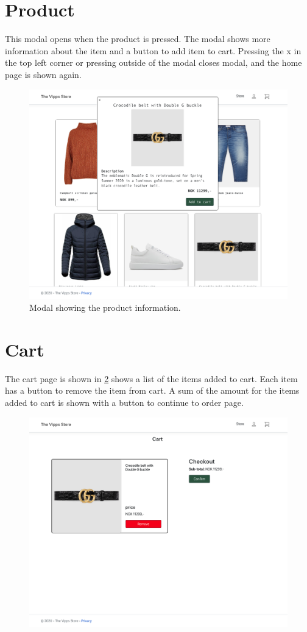 \documentclass[11pt,a4paper,english]{article}
\begin{document}
\section*{Product}
This modal opens when the product is pressed. The modal shows more information about the item and a button to add item to cart. Pressing the x in the top left corner or pressing outside of the modal closes modal, and the home page is shown again.
\begin{figure}[htbp]
  \centering
  \includegraphics[scale=0.3]{item}
  \caption{Modal showing the product information.}
  \label{fig:item}
\end{figure}
\section*{Cart}
The cart page is shown in \ref{fig:cart} shows a list of the items added to cart. Each item has a button to remove the item from cart. A sum of the amount for the items added to cart is shown with a button to continue to order page.
\begin{figure}[htbp]
  \centering
  \includegraphics[scale=0.3]{cart}
  \caption{}
  \label{fig:cart}
\end{figure}
\end{document}

